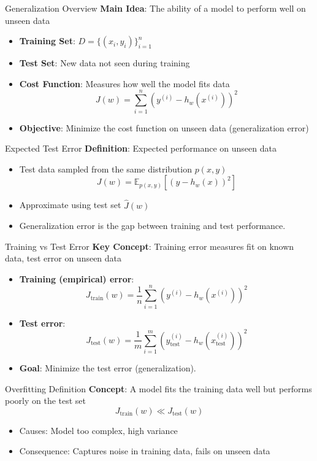 \documentclass[serif, aspectratio=169]{beamer}
\begin{document}
\begin{frame}{Generalization Overview}
    \textbf{Main Idea}: The ability of a model to perform well on unseen data
    \begin{itemize}
        \item \textbf{Training Set}: \( D = \{(x_i, y_i)\}_{i=1}^n \)
        \item \textbf{Test Set}: New data not seen during training
        \item \textbf{Cost Function}: Measures how well the model fits data
        \[
        J(w) = \sum_{i=1}^{n} (y^{(i)} - h_w(x^{(i)}))^2
        \]
        \item \textbf{Objective}: Minimize the cost function on unseen data (generalization error)
    \end{itemize}
\end{frame}

\begin{frame}{Expected Test Error}
    \textbf{Definition}: Expected performance on unseen data
    \begin{itemize}
        \item Test data sampled from the same distribution \( p(x, y) \)
        \[
        J(w) = \mathbb{E}_{p(x,y)}[(y - h_w(x))^2]
        \]
        \item Approximate using test set \( \hat{J}(w) \)
        \item Generalization error is the gap between training and test performance.
    \end{itemize}
\end{frame}

\begin{frame}{Training vs Test Error}
    \textbf{Key Concept}: Training error measures fit on known data, test error on unseen data
    \begin{itemize}
        \item \textbf{Training (empirical) error}:
        \[
        J_{\text{train}}(w) = \frac{1}{n} \sum_{i=1}^{n} \left( y^{(i)} - h_w(x^{(i)}) \right)^2
        \]
        \item \textbf{Test error}:
        \[
        J_{\text{test}}(w) = \frac{1}{m} \sum_{i=1}^{m} \left(y_{\text{test}}^{(i)} - h_w(x_{\text{test}}^{(i)})\right)^2
        \]
        \item \textbf{Goal}: Minimize the test error (generalization).
    \end{itemize}
\end{frame}

\begin{frame}{Overfitting Definition}
    \textbf{Concept}: A model fits the training data well but performs poorly on the test set
    \[
    J_{\text{train}}(w) \ll J_{\text{test}}(w)
    \]
    \begin{itemize}
        \item Causes: Model too complex, high variance
        \item Consequence: Captures noise in training data, fails on unseen data
    \end{itemize}
\end{frame}
\end{document}
